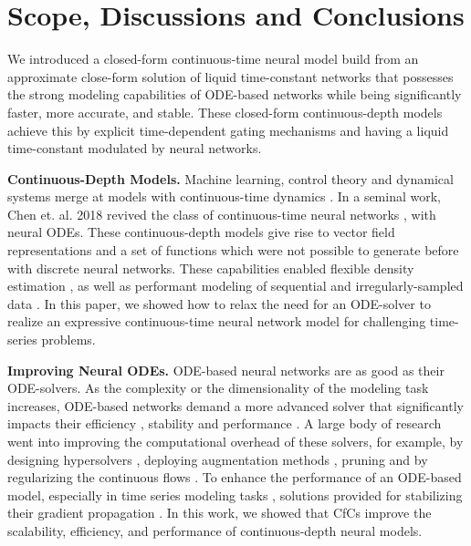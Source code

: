 \documentclass[12pt]{article}
\begin{document}
\section*{Scope, Discussions and Conclusions}
We introduced a closed-form continuous-time neural model build from an approximate close-form solution of liquid time-constant networks that possesses the strong modeling capabilities of ODE-based networks while being significantly faster, more accurate, and stable. These closed-form continuous-depth models achieve this by explicit time-dependent gating mechanisms and having a liquid time-constant modulated by neural networks.

\noindent \textbf{Continuous-Depth Models.} Machine learning, control theory and dynamical systems merge at models with continuous-time dynamics \cite{zhang2014comprehensive,weinan2017proposal,lu2017expressive,li2017maximum,lechner2019designing}. In a seminal work, Chen et. al. 2018 \cite{chen2018neural} revived the class of continuous-time neural networks \cite{cohen1983absolute,funahashi1993approximation}, with neural ODEs. These continuous-depth models give rise to vector field representations and a set of functions which were not possible to generate before with discrete neural networks. These capabilities enabled flexible density estimation \cite{grathwohl2018ffjord,dupont2019augmented,yang2019pointflow,NEURIPS2020_1aa3d9c6,hodgkinson2020stochastic}, as well as performant modeling of sequential and irregularly-sampled data \cite{rubanova2019latent,gholami2019anode,lechner2020learning,hasani2021liquid,erichson2021lipschitz}. In this paper, we showed how to relax the need for an ODE-solver to realize an expressive continuous-time neural network model for challenging time-series problems. 

\noindent \textbf{Improving Neural ODEs.} ODE-based neural networks are as good as their ODE-solvers. As the complexity or the dimensionality of the modeling task increases, ODE-based networks demand a more advanced solver that significantly impacts their efficiency \cite{poli2020hypersolvers}, stability  \cite{bai2019deep,haber2019imexnet,chang2019antisymmetricrnn,massaroli2020stable,lechner2020gershgorin} and performance \cite{hasani2021liquid}. A large body of research went into improving the computational overhead of these solvers, for example, by designing hypersolvers \cite{poli2020hypersolvers}, deploying augmentation methods \cite{dupont2019augmented,massaroli2020dissecting}, pruning \cite{liebenwein2021sparse} and by regularizing the continuous flows \cite{finlay2020train,massaroli2020stable,kidger2020hey}. To enhance the performance of an ODE-based model, especially in time series modeling tasks \cite{gleeson2018c302}, solutions provided for stabilizing their gradient propagation \cite{lechner2020learning,erichson2021lipschitz,li2020scalable}. In this work, we showed that CfCs improve the scalability, efficiency, and performance of continuous-depth neural models. 
\end{document}

